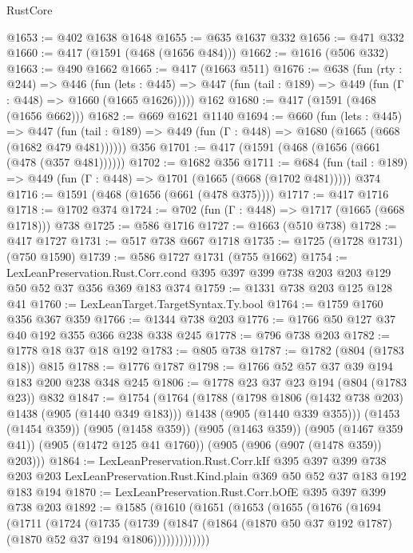 \begin{lexlean}{RustCore}
\begin{coremodule}
@1653 := @402 @1638 @1648
@1655 := @635 @1637 @332
@1656 := @471 @332
@1660 := @417 (@1591 (@468 (@1656 @484)))
@1662 := @1616 (@506 @332)
@1663 := @490 @1662
@1665 := @417 (@1663 @511)
@1676 := @638
    (fun (rty : @244) =>
    @446
      (fun (lets : @445) =>
      @447 (fun (tail : @189) => @449 (fun (Γ : @448) => @1660 (@1665 @1626)))))
    @162
@1680 := @417 (@1591 (@468 (@1656 @662)))
@1682 := @669 @1621 @1140
@1694 := @660
    (fun (lets : @445) =>
    @447 (fun (tail : @189) => @449 (fun (Γ : @448) => @1680 (@1665 (@668 (@1682 @479 @481))))))
    @356
@1701 := @417 (@1591 (@468 (@1656 (@661 (@478 (@357 @481))))))
@1702 := @1682 @356
@1711 := @684 (fun (tail : @189) => @449 (fun (Γ : @448) => @1701 (@1665 (@668 (@1702 @481))))) @374
@1716 := @1591 (@468 (@1656 (@661 (@478 @375))))
@1717 := @417 @1716
@1718 := @1702 @374
@1724 := @702 (fun (Γ : @448) => @1717 (@1665 (@668 @1718))) @738
@1725 := @586 @1716
@1727 := @1663 (@510 @738)
@1728 := @417 @1727
@1731 := @517 @738 @667 @1718
@1735 := @1725 (@1728 @1731) (@750 @1590)
@1739 := @586 @1727 @1731 (@755 @1662)
@1754 := LexLeanPreservation.Rust.Corr.cond
    @395
    @397
    @399
    @738
    @203
    @203
    @129
    @50
    @52
    @37
    @356
    @369
    @183
    @374
@1759 := @1331 @738 @203 @125 @128 @41
@1760 := LexLeanTarget.TargetSyntax.Ty.bool
@1764 := @1759 @1760 @356 @367 @359
@1766 := @1344 @738 @203
@1776 := @1766 @50 @127 @37 @40 @192 @355 @366 @238 @338 @245
@1778 := @796 @738 @203
@1782 := @1778 @18 @37 @18 @192
@1783 := @805 @738
@1787 := @1782 (@804 (@1783 @18)) @815
@1788 := @1776 @1787
@1798 := @1766 @52 @57 @37 @39 @194 @183 @200 @238 @348 @245
@1806 := @1778 @23 @37 @23 @194 (@804 (@1783 @23)) @832
@1847 := @1754
    (@1764
      (@1788
        (@1798 @1806 (@1432 @738 @203) @1438 (@905 (@1440 @349 @183)))
        @1438
        (@905 (@1440 @339 @355)))
      (@1453 (@1454 @359))
      (@905 (@1458 @359))
      (@905 (@1463 @359))
      (@905 (@1467 @359 @41))
      (@905 (@1472 @125 @41 @1760))
      (@905 (@906 (@907 (@1478 @359)) @203)))
@1864 := LexLeanPreservation.Rust.Corr.kIf
    @395
    @397
    @399
    @738
    @203
    @203
    LexLeanPreservation.Rust.Kind.plain
    @369
    @50
    @52
    @37
    @183
    @192
    @183
    @194
@1870 := LexLeanPreservation.Rust.Corr.bOfE @395 @397 @399 @738 @203
@1892 := @1585
    (@1610
      (@1651
        (@1653
          (@1655
            (@1676
              (@1694
                (@1711
                  (@1724
                    (@1735
                      (@1739
                        (@1847
                          (@1864 (@1870 @50 @37 @192 @1787) (@1870 @52 @37 @194 @1806)))))))))))))

\end{coremodule}
\end{lexlean}
